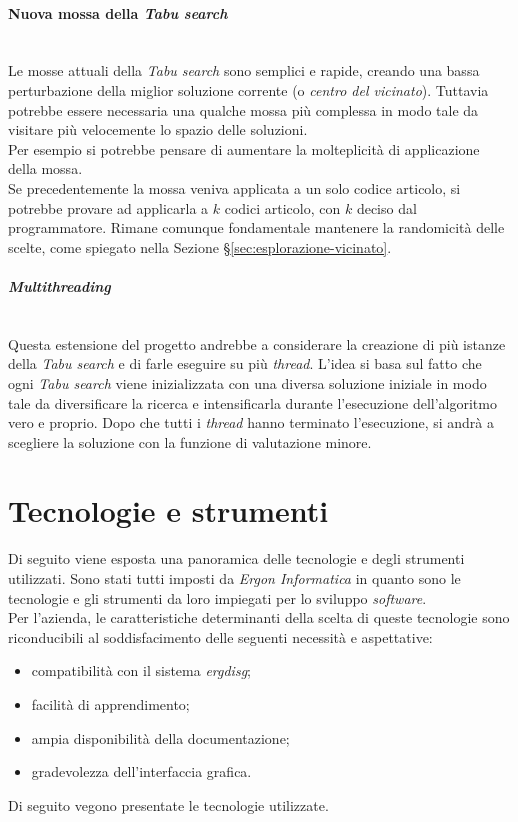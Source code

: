 \vspace*{0.3cm}
\noindent \paragraph{Nuova mossa della \textit{Tabu search}}\hfill\\
Le mosse attuali della \textit{Tabu search} sono semplici e rapide,
creando una bassa perturbazione della miglior soluzione corrente
(o \textit{centro del vicinato}). Tuttavia potrebbe essere necessaria
una qualche mossa più complessa in modo tale da visitare
più velocemente lo spazio delle soluzioni.\\
Per esempio si potrebbe pensare di aumentare la molteplicità
di applicazione della mossa.\\
Se precedentemente
la mossa veniva applicata a un solo codice articolo, si potrebbe
provare ad applicarla a $k$ codici articolo, con $k$
deciso dal programmatore. Rimane comunque fondamentale mantenere
la randomicità delle scelte, come spiegato nella Sezione §\ref{sec:esplorazione-vicinato}.
\vspace*{0.3cm}
\noindent \paragraph{\textit{Multithreading}}\hfill\\
Questa estensione del progetto andrebbe a considerare la
creazione di più istanze della \textit{Tabu search} e di farle eseguire su più \textit{thread}.
L'idea si basa sul fatto che ogni \textit{Tabu search} viene inizializzata
con una diversa soluzione iniziale in modo tale da diversificare
la ricerca e intensificarla durante l'esecuzione dell'algoritmo
vero e proprio.
Dopo che tutti i \textit{thread} hanno terminato l'esecuzione, si andrà
a scegliere la soluzione con la funzione di valutazione minore.

\newpage

\section{Tecnologie e strumenti}
\label{sec:tecnologie-strumenti}

\noindent Di seguito viene esposta una panoramica delle tecnologie e degli strumenti utilizzati.
Sono stati tutti imposti da \textit{Ergon Informatica} in quanto sono le tecnologie e gli strumenti
da loro impiegati per lo sviluppo \textit{software}.\\
Per l’azienda, le caratteristiche determinanti della scelta di queste tecnologie
sono riconducibili al soddisfacimento delle seguenti necessità e aspettative:
\begin{itemize}
    \item compatibilità con il sistema \textit{\gls{ergdisg}};
    \item facilità di apprendimento;
    \item ampia disponibilità della documentazione;
    \item gradevolezza dell’interfaccia grafica.
\end{itemize}
Di seguito vegono presentate le tecnologie utilizzate.


